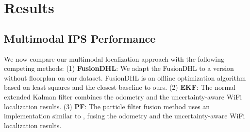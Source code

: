 \section{Results}

\subsection{Multimodal IPS Performance}

We now compare our multimodal localization approach with the following competing methods: (1) \textbf{FusionDHL}\cite{herath2021fusiondhl}: We adapt the FusionDHL to a version without floorplan on our dataset. FusionDHL is an offline optimization algorithm based on least squares and the closest baseline to ours. (2) \textbf{EKF}\cite{kalman1960new}: The normal extended Kalman filter combines the odometry and the uncertainty-aware WiFi localization results. (3) \textbf{PF}\cite{doucet2001sequential}: The particle filter fusion method uses an implementation similar to \cite{zou2017Accurate}, fusing the odometry and the uncertainty-aware WiFi localization results. 

